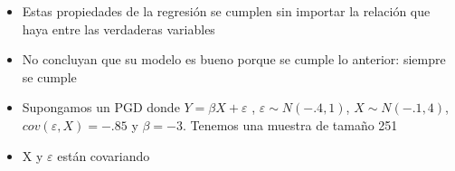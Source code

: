 \documentclass[
  ignorenonframetext,
]{beamer}
\newenvironment{Shaded}{\begin{snugshade}}{\end{snugshade}}
\newcommand{\AttributeTok}[1]{\textcolor[rgb]{0.77,0.63,0.00}{#1}}
\newcommand{\DecValTok}[1]{\textcolor[rgb]{0.00,0.00,0.81}{#1}}
\newcommand{\FunctionTok}[1]{\textcolor[rgb]{0.00,0.00,0.00}{#1}}
\newcommand{\NormalTok}[1]{#1}
\newcommand{\OtherTok}[1]{\textcolor[rgb]{0.56,0.35,0.01}{#1}}
\newcommand{\SpecialCharTok}[1]{\textcolor[rgb]{0.00,0.00,0.00}{#1}}
\providecommand{\tightlist}{%
  \setlength{\itemsep}{0pt}\setlength{\parskip}{0pt}}
\begin{document}
\begin{frame}{}
\protect\hypertarget{section-12}{}
\begin{itemize}
\tightlist
\item
  Estas propiedades de la regresión se cumplen sin importar la relación
  que haya entre las verdaderas variables
\item
  No concluyan que su modelo es bueno porque se cumple lo anterior:
  siempre se cumple
\end{itemize}
\end{frame}

\begin{frame}{}
\protect\hypertarget{section-13}{}
\begin{itemize}
\tightlist
\item
  Supongamos un PGD donde \(Y=\beta X+\varepsilon\) ,
  \(\varepsilon \sim N(-.4,1)\), \(X \sim N(-.1,4)\),
  \(cov(\varepsilon,X)=-.85\) y \(\beta=-3\). Tenemos una muestra de
  tamaño 251
\item
  X y \(\varepsilon\) están covariando
\end{itemize}
\end{frame}

\begin{frame}[fragile]{}
\protect\hypertarget{section-14}{}
\begin{Shaded}
\end{Shaded}
\end{frame}
\end{document}
